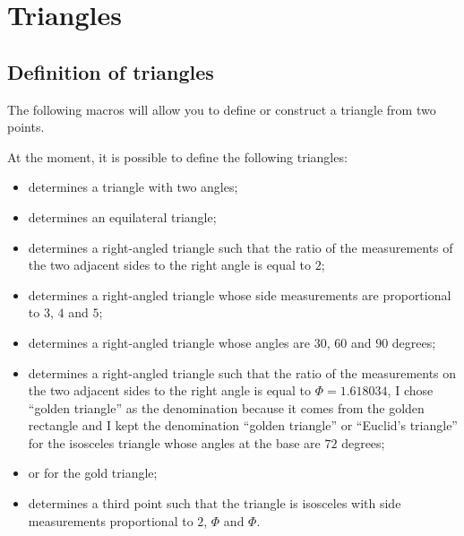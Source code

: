 \section{Triangles}

\subsection{Definition of triangles }
The following macros will allow you to define or construct a triangle from
 two points.

At the moment, it is possible to define the following triangles:
\begin{itemize}
\item {} determines a triangle with two angles;

\item {} determines an equilateral triangle;

\item {} determines a right-angled triangle such that the ratio of
the measurements of the two adjacent sides to the right angle is equal to $2$;

\item {} determines a right-angled triangle whose side
measurements are proportional to $3$, $4$ and $5$;

\item {} determines a right-angled triangle whose angles are $30$,
$60$ and $90$ degrees;

\item {} determines a right-angled triangle such that the ratio of
the measurements on the two adjacent sides to the right angle is equal to
$\Phi=1.618034$, I chose \enquote{golden triangle} as the denomination because it comes
from the golden rectangle and I kept the denomination \enquote{golden triangle} or
\enquote{Euclid's triangle} for the isosceles triangle whose angles at the base are $72$
degrees;

\item {} or  for the gold triangle;

\item {} determines a third point such that the triangle is
isosceles with side measurements proportional to $2$, $\Phi$ and $\Phi$.
\end{itemize}


